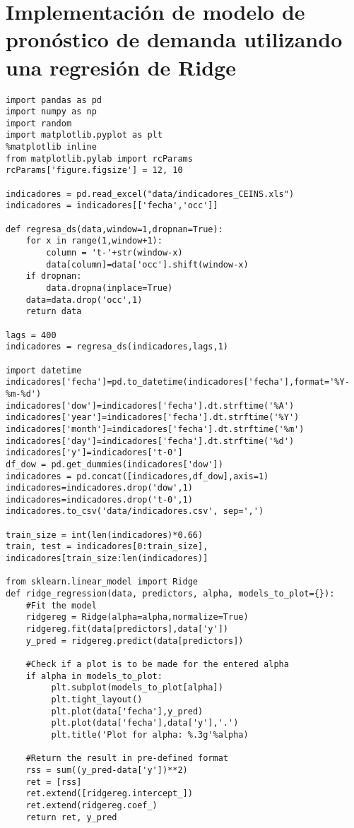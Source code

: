 \chapter{Implementación de modelo de pronóstico de demanda utilizando una regresión de Ridge}
\label{ch:anexob}

\begin{verbatim}
import pandas as pd
import numpy as np
import random
import matplotlib.pyplot as plt
%matplotlib inline
from matplotlib.pylab import rcParams
rcParams['figure.figsize'] = 12, 10

indicadores = pd.read_excel("data/indicadores_CEINS.xls")
indicadores = indicadores[['fecha','occ']]

def regresa_ds(data,window=1,dropnan=True):
    for x in range(1,window+1):
        column = 't-'+str(window-x)
        data[column]=data['occ'].shift(window-x)
    if dropnan:
        data.dropna(inplace=True)
    data=data.drop('occ',1)
    return data
    
lags = 400
indicadores = regresa_ds(indicadores,lags,1)

import datetime
indicadores['fecha']=pd.to_datetime(indicadores['fecha'],format='%Y-%m-%d')
indicadores['dow']=indicadores['fecha'].dt.strftime('%A')
indicadores['year']=indicadores['fecha'].dt.strftime('%Y')
indicadores['month']=indicadores['fecha'].dt.strftime('%m')
indicadores['day']=indicadores['fecha'].dt.strftime('%d')
indicadores['y']=indicadores['t-0']
df_dow = pd.get_dummies(indicadores['dow'])
indicadores = pd.concat([indicadores,df_dow],axis=1)
indicadores=indicadores.drop('dow',1)
indicadores=indicadores.drop('t-0',1)
indicadores.to_csv('data/indicadores.csv', sep=',')

train_size = int(len(indicadores)*0.66)
train, test = indicadores[0:train_size], indicadores[train_size:len(indicadores)]

from sklearn.linear_model import Ridge
def ridge_regression(data, predictors, alpha, models_to_plot={}):
    #Fit the model
    ridgereg = Ridge(alpha=alpha,normalize=True)
    ridgereg.fit(data[predictors],data['y'])
    y_pred = ridgereg.predict(data[predictors])
    
    #Check if a plot is to be made for the entered alpha
    if alpha in models_to_plot:
         plt.subplot(models_to_plot[alpha])
         plt.tight_layout()
         plt.plot(data['fecha'],y_pred)
         plt.plot(data['fecha'],data['y'],'.')
         plt.title('Plot for alpha: %.3g'%alpha)
    
    #Return the result in pre-defined format
    rss = sum((y_pred-data['y'])**2)
    ret = [rss]
    ret.extend([ridgereg.intercept_])
    ret.extend(ridgereg.coef_)
    return ret, y_pred
    

\end{verbatim}
